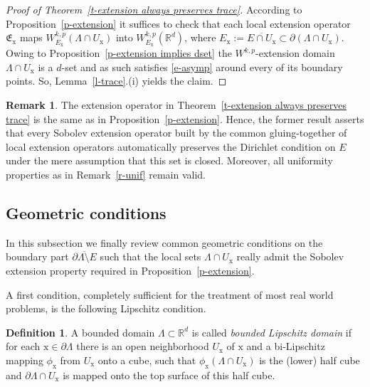 \documentclass[10pt,leqno]{amsart}
\theoremstyle{definition}
\newtheorem{definition}[theorem]{Definition}
\newtheorem{remark}[theorem]{Remark}
\numberwithin{equation}{section}
\begin{document}
\begin{proof}[Proof of Theorem~\ref{t-extension always preserves trace}]
According to Proposition~\ref{p-extension} it suffices to check that each local
extension operator $\mathfrak{E}_{{\mathrm x}}$ maps $W_{E_{{\mathrm x}}}^{k,p}(\Lambda \cap U_{{\mathrm x}})$
into $W_{E_{{\mathrm x}}}^{k,p}({{\mathbb R}}^d)$, where $E_{{\mathrm x}} := \overline{E \cap U_{{\mathrm x}}}
\subset \partial(\Lambda \cap U_{{\mathrm x}})$. Owing to Proposition~\ref{p-extension
implies dset} the $W^{k,p}$-extension domain $\Lambda \cap U_{{\mathrm x}}$
is a $d$-set and as such satisfies \eqref{e-asymp} around every of its boundary
points. So, Lemma~\ref{l-trace}.(i) yields the claim.
\end{proof}

\begin{remark}\label{r-extension always preserves trace}
The extension operator in Theorem~\ref{t-extension
always preserves trace} is the same as in Proposition~\ref{p-extension}. Hence,
the former result asserts that every Sobolev extension operator built by
the common gluing-together of local extension operators automatically preserves
the Dirichlet condition on $E$ under the mere assumption that this set is
closed. Moreover, all uniformity properties as in Remark~\ref{r-unif} remain
valid. 
\end{remark}

\subsection{Geometric conditions} \label{Subsec: geometric conditions}
In this subsection we finally review common geometric conditions on the boundary
part $\overline {\partial \Lambda \setminus E}$ such that the local sets
$\Lambda \cap U_{{\mathrm x}}$ really admit the Sobolev extension property required in
Proposition~\ref{p-extension}. 

A first condition, completely sufficient for the treatment of most real world
problems, is the following Lipschitz condition.

\begin{definition}\label{d-Lipschitzdomain}
A bounded domain $\Lambda \subset {{\mathbb R}}^d$ is called \emph{bounded Lipschitz
domain} if for each ${{\mathrm x}} \in \partial \Lambda$ there is an open neighborhood
$U_{{\mathrm x}}$ of ${{\mathrm x}}$ and a bi-Lipschitz mapping $\phi_{{\mathrm x}}$ from $U_{{\mathrm x}}$ onto a cube,
such that $\phi_{{\mathrm x}}(\Lambda \cap U_{{\mathrm x}})$ is the (lower) half cube and $\partial
\Lambda \cap U_{{\mathrm x}}$ is mapped onto the top surface of this half cube.
\end{definition}
\end{document}
